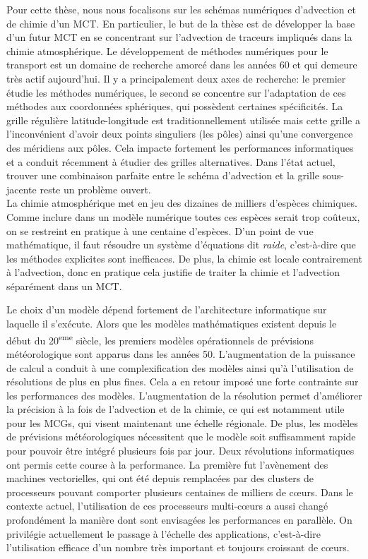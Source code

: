 Pour cette thèse, nous nous focalisons sur les schémas numériques d'advection et
de chimie d'un MCT\@. En particulier, le but de la thèse est de développer la
base d'un futur MCT en se concentrant sur l'advection de traceurs impliqués dans
la chimie atmosphérique.  Le développement de méthodes numériques pour le
transport est un domaine de recherche amorcé dans les années 60 et qui demeure
très actif aujourd'hui. Il y a principalement deux axes de recherche: le premier
étudie les méthodes numériques, le second se concentre sur l'adaptation de ces
méthodes aux coordonnées sphériques, qui possèdent certaines spécificités. La
grille régulière latitude-longitude est traditionnellement utilisée mais cette
grille a l'inconvénient d'avoir deux points singuliers (les p\^oles) ainsi qu'une
convergence des méridiens aux p\^oles. Cela impacte fortement les performances
informatiques et a conduit récemment à étudier des grilles alternatives.  Dans
l'état actuel, trouver une combinaison parfaite entre le schéma d'advection et
la grille sous-jacente reste un problème ouvert. \\ 
La chimie atmosphérique met en jeu des dizaines de milliers d'espèces chimiques.
Comme inclure dans un modèle numérique toutes ces espèces serait trop coûteux,
on se restreint en pratique à une centaine d'espèces. D'un point de vue
mathématique, il faut résoudre un système d'équations dit \textit{raide},
c'est-à-dire que les méthodes explicites sont inefficaces. De plus, la chimie
est locale contrairement à l'advection, donc en pratique cela justifie de
traiter la chimie et l'advection séparément dans un MCT\@.

Le choix d'un modèle dépend fortement de l'architecture informatique sur
laquelle il s'exécute. Alors que les modèles mathématiques existent depuis le
début du 20\textsuperscript{eme} siècle, les premiers modèles opérationnels de
prévisions mé\-téo\-ro\-lo\-gi\-que sont apparus dans les années 50.
L'augmentation de la puissance de calcul a conduit à une complexification des
modèles ainsi qu'à l'utilisation de résolutions de plus en plus fines. Cela a en
retour imposé une forte contrainte sur les performances des modèles.
L'augmentation de la résolution permet d'améliorer la précision à la fois de
l'advection et de la chimie, ce qui est notamment utile pour les MCGs, qui
visent maintenant une échelle régionale. De plus, les modèles de prévisions
météorologiques nécessitent que le modèle soit suffisamment rapide pour pouvoir
être intégré plusieurs fois par jour. Deux révolutions informatiques ont permis cette
course à la performance. La première fut l'avènement des machines vectorielles,
qui ont été depuis remplacées par des clusters de processeurs pouvant comporter
plusieurs centaines de milliers de c\oe{}urs. Dans le contexte actuel,
l'utilisation de ces processeurs multi-c\oe{}urs a aussi changé profondément la
manière dont sont envisagées les performances en parallèle. On privilégie
actuellement le passage à l'échelle des applications, c'est-à-dire l'utilisation
efficace d'un nombre très important et toujours croissant de c\oe{}urs.


